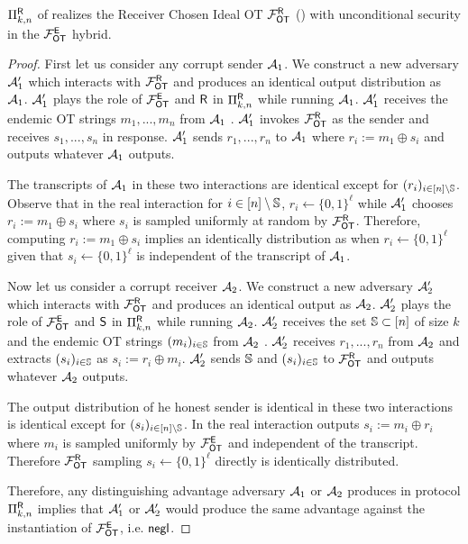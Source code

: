 \begin{lemma}\label{lem:EtoR}
	$\Pi^{\mathsf{R}}_{k,n}$ of  realizes the Receiver Chosen Ideal OT $\mathcal{F}_{\mathsf{OT}}^{\mathsf{R}}$ () with unconditional security in the $\mathcal{F}_{\mathsf{OT}}^\mathsf{E}$ hybrid.
\end{lemma}
\iffullversion
\begin{proof}
	First let us consider any corrupt sender $\mathcal{A}_1$. We construct a new adversary $\mathcal{A}_1'$ which interacts with $\mathcal{F}_{\mathsf{OT}}^{\mathsf{R}}$ and produces an identical output distribution as $\mathcal{A}_1$.  $\mathcal{A}_1'$ plays the role of $\mathcal{F}_{\mathsf{OT}}^\mathsf{E}$ and $\mathsf{R}$ in $\Pi^{\mathsf{R}}_{k,n}$ while running $\mathcal{A}_1$. $\mathcal{A}_1'$ receives the endemic OT strings $m_1,...,m_n$ from $\mathcal{A}_1$%
. $\mathcal{A}_1'$ invokes $\mathcal{F}_{\mathsf{OT}}^{\mathsf{R}}$ as the sender and receives $s_1,...,s_n$ in response. $\mathcal{A}_1'$ sends $r_1,...,r_n$ to $\mathcal{A}_1$ where $r_i:=m_1\oplus s_i$ and 	 outputs whatever $\mathcal{A}_1$ outputs.
	
	The transcripts of $\mathcal{A}_1$ in these two interactions are identical except for $(r_i)_{i\in [n]\setminus \mathsf{\mathbb S}}$. Observe that in the real interaction for $i\in [n]\setminus\mathsf{\mathbb S}$, $r_i\gets\{0,1\}^\ell$ while $\mathcal{A}_1'$ chooses $r_i:=m_1\oplus s_i$ where $s_i$ is sampled uniformly at random by $\mathcal{F}_{\mathsf{OT}}^{\mathsf{R}}$. Therefore, computing $r_i:=m_1\oplus s_i$ implies an identically distribution as when $r_i\gets\{0,1\}^\ell$ given that $s_i\gets\{0,1\}^\ell$ is independent of the transcript of $\mathcal{A}_1$. 
	
	
	Now let us consider a corrupt receiver $\mathcal{A}_2$. We construct a new adversary $\mathcal{A}_2'$ which interacts with $\mathcal{F}_{\mathsf{OT}}^{\mathsf{R}}$ and produces an identical output as $\mathcal{A}_2$. $\mathcal{A}_2'$ plays the role of $\mathcal{F}_{\mathsf{OT}}^\mathsf{E}$ and $\mathsf{S}$ in $\Pi^{\mathsf{R}}_{k,n}$ while running $\mathcal{A}_2$. $\mathcal{A}_2'$ receives the set $\mathsf{\mathbb S}\subset[n]$ of size $k$ and the endemic OT strings $(m_i)_{i\in \mathsf{\mathbb S}}$ from $\mathcal{A}_2$%
. $\mathcal{A}_2'$ receives $r_1,...,r_n$ from $\mathcal{A}_2$ %
 and extracts $(s_i)_{i\in \mathsf{\mathbb S}}$ as $s_i:=r_i\oplus m_i$. $\mathcal{A}_2'$ sends $\mathsf{\mathbb S}$ and $(s_i)_{i\in \mathsf{\mathbb S}}$ to $\mathcal{F}_{\mathsf{OT}}^{\mathsf{R}}$ and outputs whatever $\mathcal{A}_2$ outputs.
	
	The output distribution of he honest sender is identical in these two interactions is identical except for $(s_i)_{i\in [n]\setminus \mathsf{\mathbb S}}$. In the real interaction \send outputs $s_i:=m_i\oplus r_i$ where $m_i$ is sampled uniformly by $\mathcal{F}_{\mathsf{OT}}^\mathsf{E}$ and independent of the transcript. Therefore $\mathcal{F}_{\mathsf{OT}}^{\mathsf{R}}$ sampling $s_i\gets\{0,1\}^\ell$ directly is identically distributed.
	
	Therefore, any distinguishing advantage adversary $\mathcal{A}_1$ or $\mathcal{A}_2$ produces in protocol $\Pi^{\mathsf{R}}_{k,n}$ implies  that $\mathcal{A}_1'$ or $\mathcal{A}_2'$ would produce the same advantage against the instantiation of $\mathcal{F}_{\mathsf{OT}}^\mathsf{E}$, i.e. $\mathsf{negl}$.
\end{proof}
